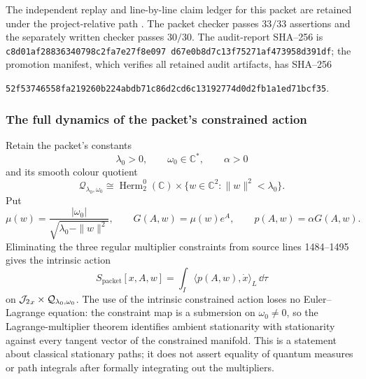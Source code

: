 The independent replay and line-by-line claim ledger for this packet are
retained under the project-relative path
\allowbreak
{}.
The packet checker passes \(33/33\) assertions and the separately written
checker passes \(30/30\).  The audit-report SHA--256 is
\texttt{c8d01af28836340798c2fa7e27f8e097\allowbreak%
d67e0b8d7c13f75271af473958d391df}; the promotion manifest, which verifies
all retained audit artifacts, has SHA--256
\par\noindent
\texttt{52f53746558fa219260b224abdb71c86d2cd6c13192774d0d2fb1a1ed71bcf35}.

\subsubsection{The full dynamics of the packet's constrained action}

Retain the packet's constants
\[
 \lambda_0>0,\qquad\omega_0\in\mathbb C^*,\qquad\alpha>0
\]
and its smooth colour quotient
\[
 \mathcal Q_{\lambda_0,\omega_0}
 \cong
 \operatorname{Herm}_2^0(\mathbb C)
 \times\{w\in\mathbb C^2:\|w\|^2<\lambda_0\}.
\]
Put
\begin{equation}
 \mu(w)=\frac{|\omega_0|}
 {\sqrt{\lambda_0-\|w\|^2}},\qquad
 G(A,w)=\mu(w)e^A,\qquad
 p(A,w)=\alpha G(A,w).
 \label{wpr:eq:packet-p}
\end{equation}
Eliminating the three regular multiplier constraints from source lines
1484--1495 gives the intrinsic action
\begin{equation}
 S_{\mathrm{packet}}[x,A,w]
 =\int_I\langle p(A,w),\dot x\rangle_L\,\dd\tau
 \label{wpr:eq:packet-action}
\end{equation}
on \({\mathcal J_2}_x\times\mathcal Q_{\lambda_0,\omega_0}\).  The use of the
intrinsic constrained action loses no Euler--Lagrange equation:
the constraint map is a submersion on \(\omega_0\neq0\), so the
Lagrange-multiplier theorem identifies ambient stationarity with
stationarity against every tangent vector of the constrained
manifold.  This is a statement about classical stationary paths; it
does not assert equality of quantum measures or path integrals after
formally integrating out the multipliers.

